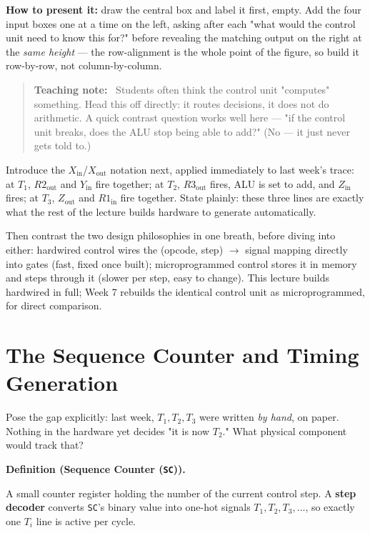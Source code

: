 \documentclass[11pt]{article}
\newenvironment{definitionbox}[1]{%
  \par\noindent\textbf{Definition (#1).}\ \itshape
}{\par\vspace{0.3em}}
\newenvironment{teachingaside}{\begin{quote}\small\color{primary-gold}\textbf{Teaching note:}\ }{\end{quote}}
\begin{document}
\textbf{How to present it:} draw the central box and label it first, empty. Add the four input boxes one at a time on the left, asking after each "what would the control unit need to know this for?" before revealing the matching output on the right at the \emph{same height} --- the row-alignment is the whole point of the figure, so build it row-by-row, not column-by-column.

\begin{teachingaside}
Students often think the control unit "computes" something. Head this off directly: it routes decisions, it does not do arithmetic. A quick contrast question works well here --- "if the control unit breaks, does the ALU stop being able to add?" (No — it just never gets told to.)
\end{teachingaside}

Introduce the $X_{\text{in}}$/$X_{\text{out}}$ notation next, applied immediately to last week's trace: at $T_1$, $R2_{\text{out}}$ and $Y_{\text{in}}$ fire together; at $T_2$, $R3_{\text{out}}$ fires, ALU is set to add, and $Z_{\text{in}}$ fires; at $T_3$, $Z_{\text{out}}$ and $R1_{\text{in}}$ fire together. State plainly: these three lines are exactly what the rest of the lecture builds hardware to generate automatically.

Then contrast the two design philosophies in one breath, before diving into either: hardwired control wires the (opcode, step) $\to$ signal mapping directly into gates (fast, fixed once built); microprogrammed control stores it in memory and steps through it (slower per step, easy to change). This lecture builds hardwired in full; Week 7 rebuilds the identical control unit as microprogrammed, for direct comparison.

\section{The Sequence Counter and Timing Generation}

Pose the gap explicitly: last week, $T_1, T_2, T_3$ were written \emph{by hand}, on paper. Nothing in the hardware yet decides "it is now $T_2$." What physical component would track that?

\begin{definitionbox}{Sequence Counter (\texttt{SC})}
A small counter register holding the number of the current control step. A \textup{\textbf{step decoder}} converts \texttt{SC}'s binary value into one-hot signals $T_1, T_2, T_3, \dots$, so exactly one $T_i$ line is active per cycle.
\end{definitionbox}
\end{document}
